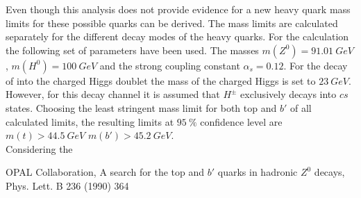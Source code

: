 \documentclass[11pt, twocolumn, a4paper]{article}
\begin{document}
Even though this analysis does not provide evidence for a new heavy quark mass limits for these possible quarks can be derived.
The mass limits are calculated separately for the different decay modes of the heavy quarks.
For the calculation the following set of parameters have been used.
The masses ${m(Z^0)=\SI{91.01}{GeV}}$, ${m(H^0) = \SI{100}{GeV}}$ and the strong coupling constant ${\alpha_s=0.12}$.
For the decay of into the charged Higgs doublet the mass of the charged Higgs is set to $\SI{23}{GeV}$.
However, for this decay channel it is assumed that $H^\pm$ exclusively decays into $cs$ states.
Choosing the least stringent mass limit for both top and $b'$ of all calculated limits, the resulting limits at $\SI{95}{\%}$ confidence level are ${m(t) > \SI{44.5}{GeV}}$ ${m(b') > \SI{45.2}{GeV}}$.\\
Considering the 


\begin{thebibliography}{99}
 OPAL Collaboration, A search for the top and $b'$ quarks in hadronic $Z^0$ decays, Phys. Lett. B 236 (1990) 364
\end{thebibliography}
\end{document}

